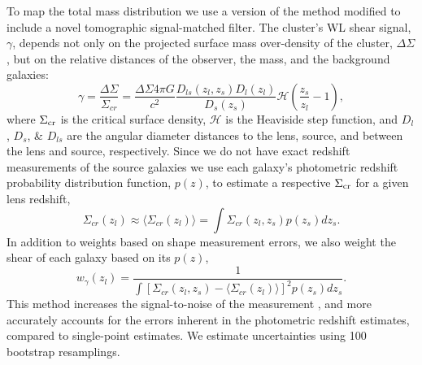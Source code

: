 To map the total mass distribution we use a version of the \citet{Fischer:1997ct} method modified to include a novel tomographic signal-matched filter.
The cluster's WL shear signal, $\gamma$, depends not only on the projected surface mass over-density of the cluster, $\Delta\Sigma$, but on the relative distances of the observer, the mass, and the background galaxies:
\begin{equation}
\gamma=\frac{\Delta\Sigma}{\Sigma_{cr}}=\frac{\Delta\Sigma4\pi G}{c^2}\frac{D_{ls}(z_l,z_s)D_l(z_l)}{D_s(z_s)}\mathcal{H}\left(\frac{z_s}{z_l}-1\right),
\end{equation}\label{equation:WLshear}
where $\Sigma_{\rm cr}$ is the critical surface density, $\mathcal{H}$ is the Heaviside step function,  and $D_l$, $D_s$, \& $D_{ls}$ are the angular diameter distances to the lens, source, and between the lens and source, respectively.
Since we do not have exact redshift measurements of the source galaxies we use each galaxy's photometric redshift probability distribution function, $p(z)$, to estimate a respective $\Sigma_{\rm cr}$ for a given lens redshift,
\begin{displaymath}
\Sigma_{cr}(z_l)\approx\langle\Sigma_{cr}(z_l)\rangle=\int\Sigma_{cr}( z_l,z_s)p(z_s)dz_s.
\end{displaymath}
In addition to weights based on shape measurement errors, we also weight the shear of each galaxy based on its $p(z)$,
\begin{displaymath}
w_{\gamma}(z_l)=\frac{1}{\int\left[\Sigma_{cr}(z_l,z_s)-\langle\Sigma_{cr}(z_l)\rangle\right]^2p(z_s)dz_s}.
\end{displaymath}
This method increases the signal-to-noise of the measurement \citep[see e.g.][]{Hennawi:2005ig}, and more accurately accounts for the errors inherent in the photometric redshift estimates, compared to single-point estimates.
We estimate uncertainties using 100 bootstrap resamplings.

